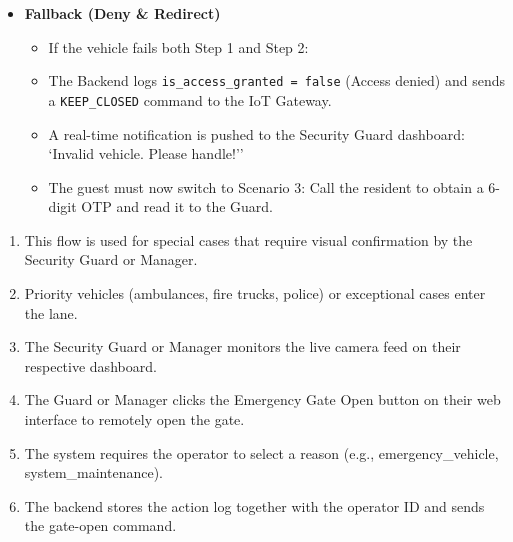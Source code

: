 \documentclass[a4paper]{article}
\begin{document}
\begin{tcolorbox}[colback=white!95!gray, colframe=black, title=Scenario 1: Happy Path (Fully Automated Flow \& Anti-spoofing)]
\begin{itemize}
    \item[\textbf{Step 3:}] \textbf{Fallback (Deny \& Redirect)}
    \begin{itemize}
        \item If the vehicle fails both Step 1 and Step 2:
        \item The Backend logs \texttt{is\_access\_granted = false} (Access denied) and sends a \texttt{KEEP\_CLOSED} command to the IoT Gateway.
        \item A real-time notification is pushed to the Security Guard dashboard: `Invalid vehicle. Please handle!''
        \item The guest must now switch to Scenario 3: Call the resident to obtain a 6-digit OTP and read it to the Guard.
    \end{itemize}
\end{itemize}
\end{tcolorbox}

\begin{tcolorbox}[colback=white!95!gray, colframe=black, title=Scenario 2: Manual Override (Remote Human Intervention)]
\begin{enumerate}
    \item This flow is used for special cases that require visual confirmation by the Security Guard or Manager.
    \item Priority vehicles (ambulances, fire trucks, police) or exceptional cases enter the lane.
    \item The Security Guard or Manager monitors the live camera feed on their respective dashboard.
    \item The Guard or Manager clicks the Emergency Gate Open button on their web interface to remotely open the gate.
    \item The system requires the operator to select a reason (e.g., emergency\_vehicle, system\_maintenance).
    \item The backend stores the action log together with the operator ID and sends the gate-open command.
\end{enumerate}
\end{tcolorbox}
\end{document}
